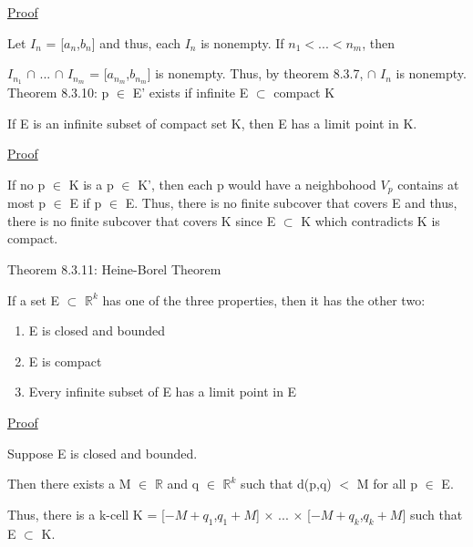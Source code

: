 { \color{magenta} \underline{Proof} } 

	Let $I_n$ = [$a_n$,$b_n$] and thus, each $I_n$ is nonempty.
	If $n_1 < ... < n_m$, then

	$I_{n_1}$ $\cap$ ... $\cap$ $I_{n_m}$
	= [$a_{n_m}$,$b_{n_m}$] is nonempty.
	Thus, by {\color{red} theorem 8.3.7}, $\cap$ $I_n$ is nonempty. \\

{ \color{red} Theorem 8.3.10: p $\in$ E' exists if
infinite E $\subset$ compact K }

	\begin{adjustbox}{minipage=14cm, right, vspace=0.1cm 0cm}
		If E is an infinite subset of compact set K, then E has a
		limit point in K.
	\end{adjustbox}

{ \color{magenta} \underline{Proof} } 

	If no p $\in$ K is a p $\in$ K', then each p would have
	a neighbohood $V_p$ contains at most p $\in$ E if p $\in$ E.
	Thus, there is no finite subcover that covers E and thus,
	there is no finite subcover that covers K since E $\subset$ K
	which contradicts K is compact. \\

\newpage

{ \color{red} Theorem 8.3.11: Heine-Borel Theorem } 

	\begin{adjustbox}{minipage=14cm, right, vspace=0.1cm 0cm}
		If a set E $\subset$ $\mathbb{R}^k$ has one of the three properties,
		then it has the other two:
	\end{adjustbox}

	\begin{enumerate}[label=(\alph*), leftmargin=2cm, itemsep=0.4em]
		\item E is closed and bounded
		\item E is compact
		\item Every infinite subset of E has a limit point in E
	\end{enumerate}

{ \color{magenta} \underline{Proof} } 

	Suppose E is closed and bounded.

	Then there exists a M $\in$ $\mathbb{R}$ and q $\in$ $\mathbb{R}^k$
	such that d(p,q) $<$ M for all p $\in$ E.
	
	Thus, there is a k-cell
	K = [$-M+q_1$,$q_1+M$] $\times$ ... $\times$ [$-M+q_k$,$q_k+M$]
	such that E $\subset$ K.

